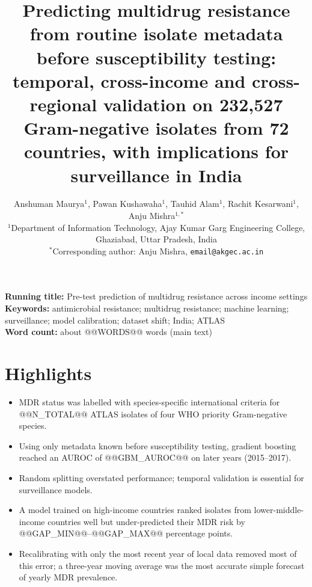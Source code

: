 \documentclass[11pt,a4paper]{article}
\title{\textbf{Predicting multidrug resistance from routine isolate metadata before susceptibility testing:\\ temporal, cross-income and cross-regional validation on 232{,}527 Gram-negative isolates from 72 countries, with implications for surveillance in India}}
\author{Anshuman Maurya$^{1}$, Pawan Kushawaha$^{1}$, Tauhid Alam$^{1}$, Rachit Kesarwani$^{1}$, Anju Mishra$^{1,*}$\\[6pt]
\small $^{1}$Department of Information Technology, Ajay Kumar Garg Engineering College,\\ \small Ghaziabad, Uttar Pradesh, India\\
\small $^{*}$Corresponding author: Anju Mishra, \texttt{email@akgec.ac.in}}
\date{}
\begin{document}
\maketitle
\thispagestyle{empty}

\noindent\textbf{Running title:} Pre-test prediction of multidrug resistance across income settings\\
\textbf{Keywords:} antimicrobial resistance; multidrug resistance; machine learning; surveillance; model calibration; dataset shift; India; ATLAS\\
\textbf{Word count:} about @@WORDS@@ words (main text)

\section*{Highlights}
\begin{itemize}
\item MDR status was labelled with species-specific international criteria for @@N_TOTAL@@ ATLAS isolates of four WHO priority Gram-negative species.
\item Using only metadata known before susceptibility testing, gradient boosting reached an AUROC of @@GBM_AUROC@@ on later years (2015--2017).
\item Random splitting overstated performance; temporal validation is essential for surveillance models.
\item A model trained on high-income countries ranked isolates from lower-middle-income countries well but under-predicted their MDR risk by @@GAP_MIN@@--@@GAP_MAX@@ percentage points.
\item Recalibrating with only the most recent year of local data removed most of this error; a three-year moving average was the most accurate simple forecast of yearly MDR prevalence.
\end{itemize}
\end{document}
